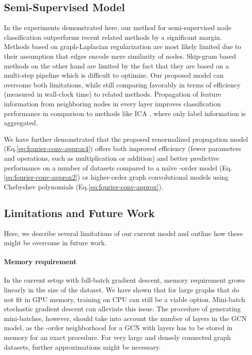 \documentclass{article} \usepackage{iclr2017_conference,times}
\makeatletter
\newcommand*{\eq}{Eq.\@\xspace}
\makeatother
\begin{document}
\subsection{Semi-Supervised Model}

In the experiments demonstrated here, our method for semi-supervised node classification outperforms recent related methods by a significant margin. Methods based on graph-Laplacian regularization \citep{zhu2003semi, belkin2006manifold, weston2012deep} are most likely limited due to their assumption that edges encode mere similarity of nodes. Skip-gram based methods on the other hand are limited by the fact that they are based on a multi-step pipeline which is difficult to optimize. Our proposed model can overcome both limitations, while still comparing favorably in terms of efficiency (measured in wall-clock time) to related methods. Propagation of feature information from neighboring nodes in every layer improves classification performance in comparison to methods like ICA \citep{lu2003link}, where only label information is aggregated.



We have further demonstrated that the proposed renormalized propagation model (\eq \ref{eq:fourier-conv-approx4}) offers both improved efficiency (fewer parameters and operations, such as multiplication or addition) and better predictive performance on a number of datasets compared to a na\"ive -order model (\eq \ref{eq:fourier-conv-approx2}) or higher-order graph convolutional models using Chebyshev polynomials (\eq \ref{eq:fourier-conv-approx}).

\subsection{Limitations and Future Work}
Here, we describe several limitations of our current model and outline how these might be overcome in future work.

\paragraph{Memory requirement}
In the current setup with full-batch gradient descent, memory requirement grows linearly in the size of the dataset. We have shown that for large graphs that do not fit in GPU memory, training on CPU can still be a viable option. Mini-batch stochastic gradient descent can alleviate this issue. The procedure of generating mini-batches, however, should take into account the number of layers in the GCN model, as the -order neighborhood for a GCN with  layers has to be stored in memory for an exact procedure. For very large and densely connected graph datasets, further approximations might be necessary.
\end{document}
